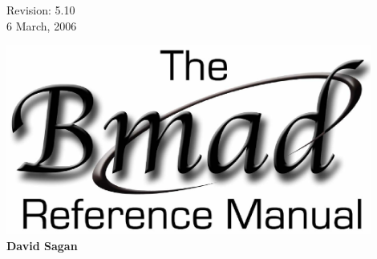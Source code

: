 \thispagestyle{empty}

\begin{flushright}
\large
  Revision: 5.10 \\
  6 March, 2006 \\
\end{flushright}

\vfill

{
\begin{center}
\includegraphics[width=12cm]{bmad_ref_manual.eps} \\
\vskip 0.3in
\huge\bf David Sagan
\end{center}
}

\vfill
\break
